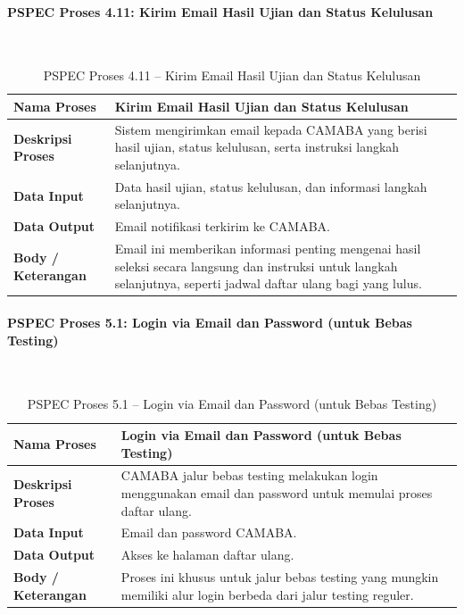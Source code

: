 \paragraph{PSPEC Proses 4.11: Kirim Email Hasil Ujian dan Status Kelulusan}~\\
\begin{longtable}{|p{}|p{}|}
	\caption{PSPEC Proses 4.11 -- Kirim Email Hasil Ujian dan Status Kelulusan}
	\label{table:3.pspec411}\\
	\hline
	\textbf{Nama Proses} & Kirim Email Hasil Ujian dan Status Kelulusan \\
	\hline
	\textbf{Deskripsi Proses} & Sistem mengirimkan email kepada CAMABA yang berisi hasil ujian, status kelulusan, serta instruksi langkah selanjutnya. \\
	\hline
	\textbf{Data Input} & Data hasil ujian, status kelulusan, dan informasi langkah selanjutnya. \\
	\hline
	\textbf{Data Output} & Email notifikasi terkirim ke CAMABA. \\
	\hline
	\textbf{Body / Keterangan} & Email ini memberikan informasi penting mengenai hasil seleksi secara langsung dan instruksi untuk langkah selanjutnya, seperti jadwal daftar ulang bagi yang lulus. \\
	\hline
\end{longtable}

\paragraph{PSPEC Proses 5.1: Login via Email dan Password (untuk Bebas Testing)}~\\
\begin{longtable}{|p{}|p{}|}
	\caption{PSPEC Proses 5.1 -- Login via Email dan Password (untuk Bebas Testing)}
	\label{table:3.pspec51}\\
	\hline
	\textbf{Nama Proses} & Login via Email dan Password (untuk Bebas Testing) \\
	\hline
	\textbf{Deskripsi Proses} & CAMABA jalur bebas testing melakukan login menggunakan email dan password untuk memulai proses daftar ulang. \\
	\hline
	\textbf{Data Input} & Email dan password CAMABA. \\
	\hline
	\textbf{Data Output} & Akses ke halaman daftar ulang. \\
	\hline
	\textbf{Body / Keterangan} & Proses ini khusus untuk jalur bebas testing yang mungkin memiliki alur login berbeda dari jalur testing reguler. \\
	\hline
\end{longtable}

